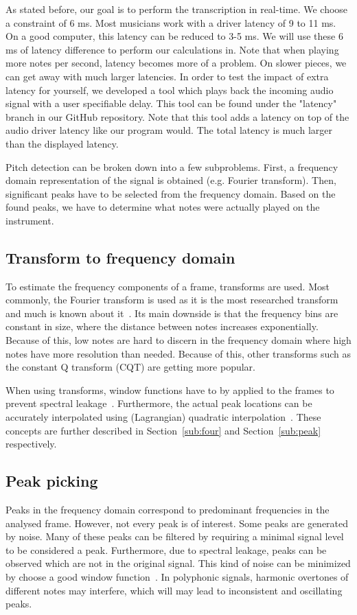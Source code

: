 \documentclass[10pt,twocolumn]{article}
\begin{document}
As stated before, our goal is to perform the transcription in real-time. We choose a constraint of 6 ms. Most musicians work with a driver latency of 9 to 11 ms. On a good computer, this latency can be reduced to 3-5 ms. We will use these 6 ms of latency difference to perform our calculations in. Note that when playing more notes per second, latency becomes more of a problem. On slower pieces, we can get away with much larger latencies. In order to test the impact of extra latency for yourself, we developed a tool which plays back the incoming audio signal with a user specifiable delay. This tool can be found under the "latency" branch in our GitHub repository. Note that this tool adds a latency on top of the audio driver latency like our program would. The total latency is much larger than the displayed latency.

Pitch detection can be broken down into a few subproblems. First, a frequency domain representation of the signal is obtained (e.g. Fourier transform). Then, significant peaks have to be selected from the frequency domain. Based on the found peaks, we have to determine what notes were actually played on the instrument.

\subsection{Transform to frequency domain}
To estimate the frequency components of a frame, transforms are used. Most commonly, the Fourier transform is used as it is the most researched transform and much is known about it~\cite{survey2}. Its main downside is that the frequency bins are constant in size, where the distance between notes increases exponentially. Because of this, low notes are hard to discern in the frequency domain where high notes have more resolution than needed. Because of this, other transforms such as the constant Q transform (CQT) are getting more popular.

When using transforms, window functions have to by applied to the frames to prevent spectral leakage~\cite{window}. Furthermore, the actual peak locations can be accurately interpolated using (Lagrangian) quadratic interpolation~\cite{interpol}. These concepts are further described in Section~\ref{sub:four} and Section~\ref{sub:peak} respectively.

\subsection{Peak picking}
Peaks in the frequency domain correspond to predominant frequencies in the analysed frame. However, not every peak is of interest. Some peaks are generated by noise. Many of these peaks can be filtered by requiring a minimal signal level to be considered a peak. Furthermore, due to spectral leakage, peaks can be observed which are not in the original signal. This kind of noise can be minimized by choose a good window function~\cite{window}. In polyphonic signals, harmonic overtones of different notes may interfere, which will may lead to inconsistent and oscillating peaks.  %
\end{document}
